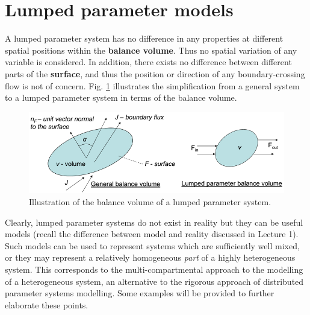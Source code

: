 \documentclass[a4paper,11pt]{article}
\theoremstyle{definition}
\begin{document}
\section{Lumped parameter models}

A lumped parameter system has no difference in any properties at different spatial positions
within the \textbf{balance volume}.
Thus no spatial variation of any variable is considered. In addition, there exists no difference 
between different parts of the \textbf{surface}, and thus the position or direction of any boundary-crossing 
flow is not of concern.
Fig. \ref{fig:lump} illustrates the simplification from a general system to a lumped parameter system in terms of the balance volume.

\begin{figure}[!h]
 \begin{center}
	\includegraphics[width=.6\textwidth]{lump}
 \end{center}
 \caption{Illustration of the balance volume of a lumped parameter system.} 
 \label{fig:lump}
\end{figure}

Clearly, lumped parameter systems do not exist in reality but they can be useful models (recall the difference between model and reality discussed in Lecture 1).
Such models can be used to represent systems which are sufficiently well mixed,
or they may represent a relatively homogeneous \emph{part} of a highly heterogeneous system.
This corresponds to the multi-compartmental approach to the modelling of a heterogeneous
system, an alternative to the rigorous approach of distributed parameter systems modelling.
Some examples will be provided to further elaborate these points.
\end{document}
